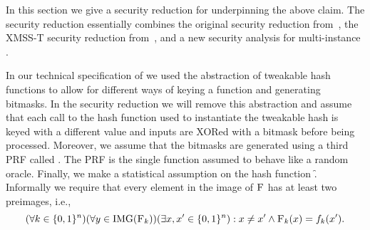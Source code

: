 

% 
% 

In this section we give a security reduction for \spx underpinning the above 
claim. The security reduction essentially combines the original \spc security 
reduction from~\cite{Bernstein2015}, the XMSS-T security reduction 
from~\cite{Huelsing2016}, and a new security analysis for multi-instance \fors.

In our technical specification of \spx we used the abstraction of tweakable 
hash functions to allow for different ways of keying a function and 
generating bitmasks. In the security reduction we will remove this abstraction
and assume that each call to the hash function used to instantiate the 
tweakable hash is keyed with a different value and inputs are XORed with a 
bitmask before being processed. Moreover, we assume that the bitmasks are 
generated using a third PRF called \prfbm. The PRF \prfbm is the single function 
assumed to behave like a random oracle. Finally, we make a statistical 
assumption on the hash function \f. Informally we require that every element 
in the image of $\textsc{F}$ has at least two preimages, i.e.,
\begin{equation}\label{req:f}
 (\forall k \in \{0,1\}^n)(\forall y \in \mathrm{IMG}(\textsc{F}_k)) (\exists x, x' \in \{0,1\}^n): x \neq x' \wedge \textsc{F}_k(x) = f_k(x').
\end{equation}

